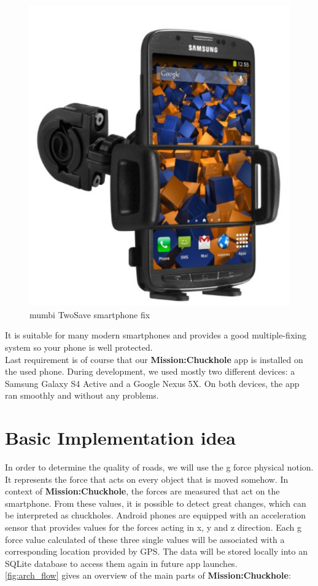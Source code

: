 \documentclass[10pt,a4paper]{article} %
\begin{document}
	\begin{figure}[H]
		\begin{center}
 		  \includegraphics[scale=0.3]{smartphone_fix}
		  \caption{mumbi TwoSave smartphone fix}
		  \label{fig:smartphone_fix}
		\end{center}
	\end{figure}
	\noindent
	It is suitable for many modern smartphones and provides a good multiple-fixing system so your phone is well protected.\\
	Last requirement is of course that our \textbf{Mission:Chuckhole} app is installed on the used phone.
	During development, we used mostly two different devices: a Samsung Galaxy S4 Active and a Google Nexus 5X.
	On both devices, the app ran smoothly and without any problems.


    \section{Basic Implementation idea}
	
	In order to determine the quality of roads, we will use the g force physical notion. 
	It represents the force that acts on every object that is moved somehow. 
	In context of \textbf{Mission:Chuckhole}, the forces are measured that act on the smartphone.
	From these values, it is possible to detect great changes, which can be interpreted as chuckholes.
	Android phones are equipped with an acceleration sensor that provides values for the forces acting in x, y and z direction.
	Each g force value calculated of these three single values will be associated with a corresponding location provided by GPS.
	The data will be stored locally into an SQLite database to access them again in future app launches.\\
	\autoref{fig:arch_flow} gives an overview of the main parts of \textbf{Mission:Chuckhole}:
	
\end{document}
